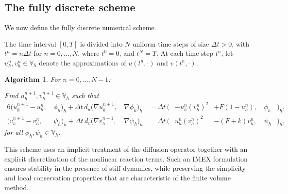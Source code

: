 \documentclass[11pt, a4paper]{amsart}
\newcommand{\VV}{\mathbb{V}}
\newtheorem{algo}{Algorithm}[section]
\numberwithin{equation}{section}
\begin{document}
	\subsection{The fully discrete scheme}\label{subsec:fully_discrete_scheme}
	
	We now define the fully discrete numerical scheme. 
	
	The time interval $[0,T]$ is divided into $N$ uniform time steps of size $\Delta t > 0$, with $t^n = n\Delta t$ for $n = 0, \dots, N$, where $t^0 = 0$, and $t^N = T$. At each time step $t^n$, let $u_h^n, v_h^n \in \VV_h$ denote the approximations of $u(t^n, \cdot)$ and $v(t^n, \cdot)$.

	
	\begin{algo}\label{algo:scheme}
		For $n = 0,\ldots,N-1$: 
		
		Find $u_h^{n+1}, v_h^{n+1} \in \VV_h$ such that
		\begin{alignat}{6}
			\label{eq:discrete_gs_vfu_0}
			\big(u_h^{n+1} - u_h^n,\, &\phi_h \big)_h + \Delta t\, d_u \big(\nabla u_h^{n+1},\, &\nabla\phi_h\big)_h
			&= \Delta t \,\big(&-u_h^n (v_h^n)^2 &+ F(1 - u_h^n),\, &\phi_h &\big)_h,  
			\\
			\label{eq:discrete_gs_vfv_0}
			\big(v_h^{n+1} - v_h^n,\, &\psi_h\big)_h + \Delta t\, d_v \big(\nabla v_h^{n+1},\, &\nabla\psi_h\big)_h
			&= \Delta t\, \big(&u_h^n (v_h^n)^2 &- (F+k)v_h^n,\, &\psi_h &\big)_h, 
		\end{alignat}
		for all   $\phi_h, \psi_h \in \VV_h$.
	\end{algo}
	This scheme uses an implicit treatment of the diffusion operator together with an explicit discretization of the nonlinear reaction terms. Such an IMEX formulation ensures stability in the presence of stiff dynamics, while preserving the simplicity and local conservation properties that are characteristic of the finite volume method.
	
	
\end{document}
